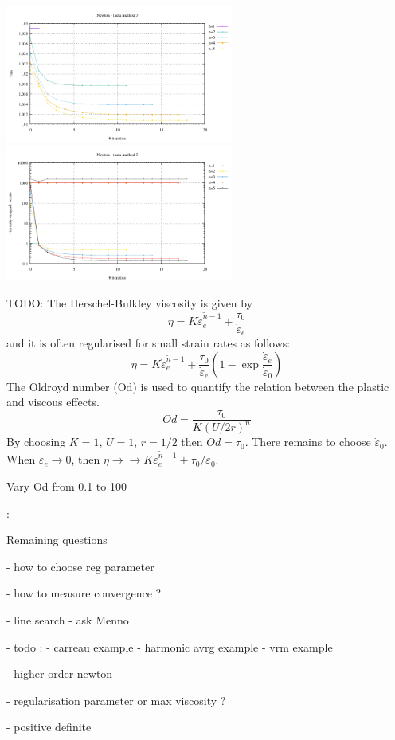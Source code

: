 \begin{center}
\includegraphics[width=7.5cm]{python_codes/fieldstone_87/results/experiment_11/vrms_meth3.pdf}
\includegraphics[width=7.5cm]{python_codes/fieldstone_87/results/experiment_11/stats_etaq_meth3.pdf}
\end{center}

TODO: The Herschel-Bulkley viscosity is given by
\[
\eta 
= K \dot{\varepsilon}_e^{\tilde{n}-1} + \frac{\tau_0}{\dot\varepsilon_e}
\]
and it is often regularised for small strain rates as follows:
\[
\eta 
= K \dot{\varepsilon}_e^{\tilde{n}-1} + \frac{\tau_0}{\dot\varepsilon_e}
\left(
1 - \exp \frac{\dot\varepsilon_e}{\dot\varepsilon_0}
\right)
\]
The Oldroyd number (Od) is used to quantify
the relation between the plastic and viscous effects.
\cite{demj04}
\[
Od =  \frac{\tau_0}{K (U/2r)^n}
\]
By choosing $K=1$, $U=1$, $r=1/2$ then $Od=\tau_0$. 
There remains to choose $\dot\varepsilon_0$. When $\dot\varepsilon_e \rightarrow 0$,
then $\eta \rightarrow \rightarrow K \dot{\varepsilon}_e^{\tilde{n}-1} + \tau_0/\dot\varepsilon_0$.



Vary Od from 0.1 to 100 




\newpage

\Literature: \textcite{russ20} \textcite{spmw16}

Remaining questions

- how to choose reg parameter

- how to measure convergence ?

- line search - ask Menno

- todo : 
  - carreau example
  - harmonic avrg example
  - vrm example

- higher order newton

- regularisation parameter or max viscosity ?

- positive definite

